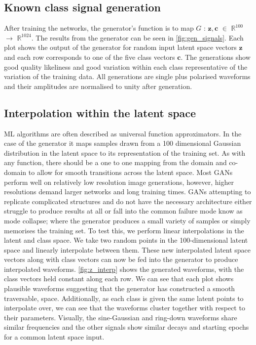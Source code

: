 \documentclass[12pt]{iopart}
\begin{document}
\subsection{Known class signal generation}

After training the networks, the generator's function is to map $G$ : $\mathbf{z},\mathbf{c} $ $\in$
$\mathbb{R}^{100}$ $\to$ $\mathbb{R}^{1024}$. The results from the
generator can be seen in \cref{fig:gen_signals}. Each plot shows the output of
the generator for random input latent space vectors $\mathbf{z}$ and each row
corresponds to one of the five class vectors $\mathbf{c}$. The generations show good quality likeliness and good variation within each class representative of the variation of the training data. All generations are single plus polarised waveforms and their amplitudes are normalised to unity after generation. 

\subsection{Interpolation within the latent space}

%
\ac{ML} algorithms are often described as universal function approximators. In
the case of the generator it maps samples drawn from a 100 dimensional Gaussian
distribution in the latent space to its representation of the training set. As
with any function, there should be a one to one mapping from the domain and
co-domain to allow for smooth transitions across the latent space. Most GANs perform well on relatively low resolution
image generations, however, higher resolutions demand larger networks and long
training times. GANs attempting to replicate complicated structures and do not
have the necessary architecture either struggle to produce results at all or
fall into the common failure mode know as mode collapse; where the generator
produces a small variety of samples or simply memorises the training set. To
test this, we perform linear interpolations in the latent and class
space. We take two random
points in the 100-dimensional latent space and linearly interpolate between them. These new interpolated latent space vectors along with class vectors can now be fed into the generator to produce interpolated waveforms. \cref{fig:z_interp} shows the generated waveforms, with the class vectors held constant along each row. We can see that each plot shows plausible waveforms suggesting that
the generator has constructed a smooth traversable, space. Additionally, as each class is given
the same latent points to interpolate over, we can see that the waveforms
cluster together with respect to their parameters. Visually, the sine-Gaussian
and ring-down waveforms share similar frequencies and the other signals show
similar decays and starting epochs for a common latent space input. 
 
\end{document}
